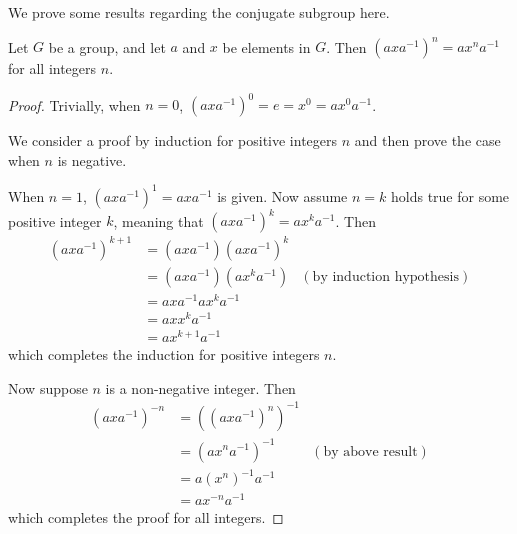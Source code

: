 We prove some results regarding the conjugate subgroup here.
\begin{proposition}\label{prop-power-of-conjugate-equals-conjugate-of-power}
    Let $G$ be a group, and let $a$ and $x$ be elements in $G$. Then $(axa^{-1})^n = ax^na^{-1}$ for all integers $n$.
\end{proposition}
\begin{proof}
    Trivially, when $n = 0$, $(axa^{-1})^0 = e = x^0 = ax^0a^{-1}$.

    We consider a proof by induction for positive integers $n$ and then prove the case when $n$ is negative.

    When $n = 1$, $(axa^{-1})^1 = axa^{-1}$ is given. Now assume $n = k$ holds true for some positive integer $k$, meaning that $(axa^{-1})^k = ax^ka^{-1}$. Then
    \begin{align*}
        (axa^{-1})^{k+1} &= (axa^{-1})(axa^{-1})^k\\
        &= (axa^{-1})(ax^ka^{-1}) & (\text{by induction hypothesis})\\
        &= axa^{-1}ax^ka^{-1}\\
        &= axx^ka^{-1}\\
        &= ax^{k+1}a^{-1}
    \end{align*}
    which completes the induction for positive integers $n$.

    Now suppose $n$ is a non-negative integer. Then
    \begin{align*}
        (axa^{-1})^{-n} &= ((axa^{-1})^n)^{-1}\\
        &= (ax^na^{-1})^{-1} & (\text{by above result})\\
        &= a(x^n)^{-1}a^{-1}\\
        &= ax^{-n}a^{-1}
    \end{align*}
    which completes the proof for all integers.
\end{proof}

